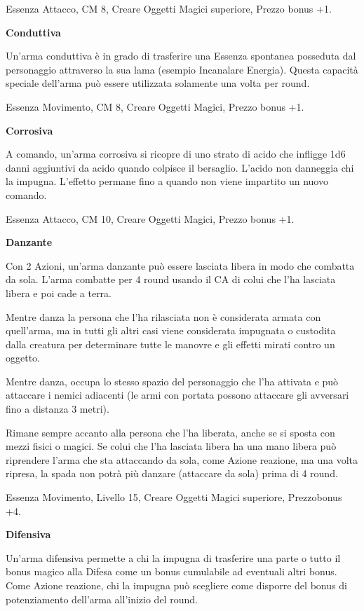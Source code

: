 \documentclass[a4paper,11pt,twoside,openany]{book}
\begin{document}
{Essenza Attacco, CM 8, Creare Oggetti Magici superiore, Prezzo bonus +1.

\textbf{Conduttiva}

Un'arma conduttiva è in grado di trasferire una Essenza spontanea posseduta dal personaggio attraverso la sua lama (esempio Incanalare Energia). Questa capacità speciale dell'arma può essere utilizzata solamente una volta per round.

Essenza Movimento, CM 8, Creare Oggetti Magici, Prezzo bonus +1.

\textbf{Corrosiva}

A comando, un'arma corrosiva si ricopre di uno strato di acido che infligge 1d6 danni aggiuntivi da acido quando colpisce il bersaglio. L'acido non danneggia chi la impugna. L'effetto permane fino a quando non viene impartito un nuovo comando.

Essenza Attacco, CM 10, Creare Oggetti Magici, Prezzo bonus +1.

\textbf{Danzante}

Con 2 Azioni, un'arma danzante può essere lasciata libera in modo che combatta da sola. L'arma combatte per 4 round usando il CA di colui che l'ha lasciata libera e poi cade a terra. 

Mentre danza la persona che l'ha rilasciata non è considerata armata con quell'arma, ma in tutti gli altri casi viene considerata impugnata o custodita dalla creatura per determinare tutte le manovre e gli effetti mirati contro un oggetto. 

Mentre danza, occupa lo stesso spazio del personaggio che l'ha attivata e può attaccare i nemici adiacenti (le armi con portata possono attaccare gli avversari fino a distanza 3 metri). 

Rimane sempre accanto alla persona che l'ha liberata, anche se si sposta con mezzi fisici o magici. Se colui che l'ha lasciata libera ha una mano libera può riprendere l'arma che sta attaccando da sola, come Azione reazione, ma una volta ripresa, la spada non potrà più danzare (attaccare da sola) prima di 4 round.

Essenza Movimento, Livello 15, Creare Oggetti Magici superiore, Prezzobonus +4.

\textbf{Difensiva}

Un'arma difensiva permette a chi la impugna di trasferire una parte o tutto il bonus magico alla Difesa come un bonus cumulabile ad eventuali altri bonus. Come Azione reazione, chi la impugna può scegliere come disporre del bonus di potenziamento dell'arma all'inizio del round.

}
\end{document}
